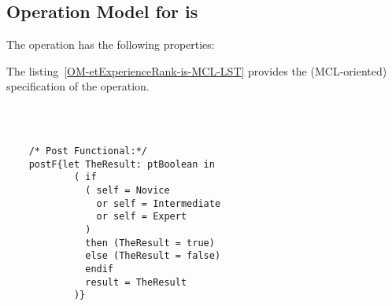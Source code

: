 \subsection{Operation Model for is}

\label{OM-is}


The  operation has the following properties:

	\begin{operationmodel}



		


	\end{operationmodel}



	\vspace{1cm}
	The listing~\ref{OM-etExperienceRank-is-MCL-LST} provides the \msrmessir (MCL-oriented) specification of the operation.
	
	\scriptsize
	\vspace{0.5cm}
	\begin{lstlisting}[style=MessirStyle,firstnumber=auto,captionpos=b,caption={\msrmessir (MCL-oriented) specification of the operation \emph{is}.},label=OM-etExperienceRank-is-MCL-LST]

	
	
	/* Post Functional:*/ 
	postF{let TheResult: ptBoolean in
	        ( if
	          ( self = Novice
	            or self = Intermediate
	            or self = Expert
	          )
	          then (TheResult = true)
	          else (TheResult = false)
	          endif
	          result = TheResult
	        )}
	
	
	\end{lstlisting}
	\normalsize 
	
	
	
	





